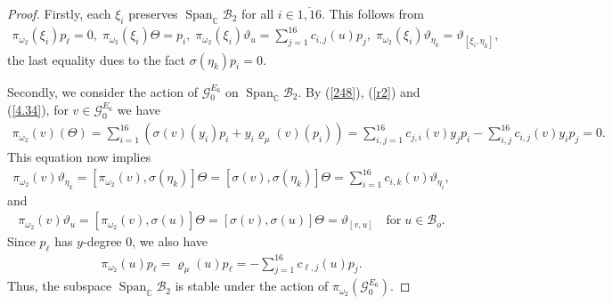 \documentclass[12pt]{article}
\numberwithin{equation}{section}
\theoremstyle{definition}
\theoremstyle{remark}
\begin{document}
\begin{proof}
	 Firstly, each $\xi_i$ preserves $\operatorname{Span}_{\mathbb{C}}\mathcal{B}_2$ for all $i\in\overline{1,16}$. This follows from
	\begin{eqnarray}
		\pi_{\omega_2}(\xi_i)p_\ell=0,\;\pi_{\omega_2}(\xi_i)\Theta=p_i,\;\pi_{\omega_2}(\xi_i)\vartheta_{u}=\sum_{j=1}^{16}c_{i,j}(u)p_j,\;\pi_{\omega_2}(\xi_i)\vartheta_{\eta_k}=\vartheta_{[\xi_i,\eta_k]}, \label{4,38}
	\end{eqnarray}
	the last equality dues to the fact $\sigma(\eta_k)p_i=0$.
	
	Secondly, we consider the action of $\mathscr{G}^{E_6}_0$ on $\operatorname{Span}_{\mathbb{C}}\mathcal{B}_2$. By (\ref{248}), (\ref{r2}) and (\ref{4.34}), for $v\in\mathscr{G}^{E_6}_0$ we have
	\begin{eqnarray}
		\pi_{\omega_2}(v)(\Theta)=\sum_{i=1}^{16}(\sigma(v)(y_i)p_i+y_i\varrho_{\mu}(v)(p_i))=\sum_{i,j=1}^{16}c_{j,i}(v)y_jp_i-\sum_{i,j}^{16}c_{i,j}(v)y_ip_j=0.\label{4.38}
	\end{eqnarray}
	This equation now implies
	\begin{eqnarray}
		\pi_{\omega_2}(v)\vartheta_{\eta_k}=[\pi_{\omega_2}(v),\sigma(\eta_k)]\Theta=[\sigma(v),\sigma(\eta_k)]\Theta=\sum_{i=1}^{16}c_{i,k}(v)\vartheta_{\eta_i}, \label{4.40}
	\end{eqnarray}
	and
	\begin{eqnarray}
		\pi_{\omega_2}(v)\vartheta_u=[\pi_{\omega_2}(v),\sigma(u)]\Theta=[\sigma(v),\sigma(u)]\Theta=\vartheta_{[v,u]}\quad\text{for}\;u\in\mathcal{B}_o. \label{4.41}
	\end{eqnarray}
	Since $p_\ell$ has $y$-degree $0$, we also have
	\begin{eqnarray}
		\pi_{\omega_2}(u)p_\ell=\varrho_{\mu}(u)p_\ell=-\sum_{j=1}^{16}c_{\ell,j}(u)p_{j}.
	\end{eqnarray}
	Thus, the subspace $\operatorname{Span}_{\mathbb{C}}\mathcal{B}_2$ is stable under the action of $\pi_{\omega_2}(\mathscr{G}^{E_6}_0)$.
	

\end{proof}
\end{document}
